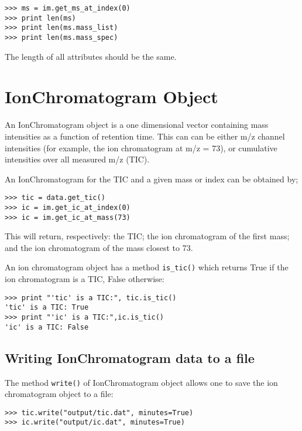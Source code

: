 \begin{verbatim}
>>> ms = im.get_ms_at_index(0)
>>> print len(ms)
>>> print len(ms.mass_list)
>>> print len(ms.mass_spec)
\end{verbatim}

\noindent
The length of all attributes should be the same.

\section{IonChromatogram Object}


\noindent
An IonChromatogram object is a one dimensional vector containing
mass intensities as a function of retention time. This can can be either
m/z channel intensities (for example, the ion chromatogram at m/z = 73),
or cumulative intensities over all measured m/z (TIC).

An IonChromatogram for the TIC and a given mass or index can be obtained by;

\begin{verbatim}
>>> tic = data.get_tic()
>>> ic = im.get_ic_at_index(0)
>>> ic = im.get_ic_at_mass(73)
\end{verbatim}

\noindent
This will return, respectively: the TIC; the ion chromatogram of the first mass;
and the ion chromatogram of the mass closest to 73.

An ion chromatogram object has a method {\tt is\_tic()} which returns
True if the ion chromatogram is a TIC, False otherwise:

\begin{verbatim}
>>> print "'tic' is a TIC:", tic.is_tic()
'tic' is a TIC: True
>>> print "'ic' is a TIC:",ic.is_tic()
'ic' is a TIC: False
\end{verbatim}

\subsection{Writing IonChromatogram data to a file}


The method {\tt write()} of IonChromatogram object allows one to save
the ion chromatogram object to a file:

\begin{verbatim}
>>> tic.write("output/tic.dat", minutes=True)
>>> ic.write("output/ic.dat", minutes=True)
\end{verbatim}

